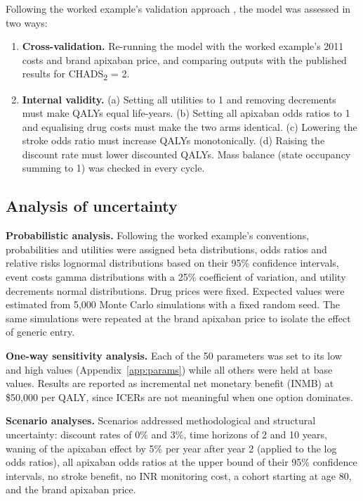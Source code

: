 \documentclass[11pt,letterpaper]{article}
\begin{document}
Following the worked example's validation approach \cite{cadthwe}, the model was assessed in two
ways:
\begin{enumerate}
  \item \textbf{Cross-validation.} Re-running the model with the worked example's 2011 costs and
        brand apixaban price, and comparing outputs with the published results for
        CHADS\textsubscript{2} = 2.
  \item \textbf{Internal validity.} (a) Setting all utilities to 1 and removing decrements must
        make QALYs equal life-years. (b) Setting all apixaban odds ratios to 1 and equalising drug
        costs must make the two arms identical. (c) Lowering the stroke odds ratio must increase
        QALYs monotonically. (d) Raising the discount rate must lower discounted QALYs. Mass balance
        (state occupancy summing to 1) was checked in every cycle.
\end{enumerate}

\subsection{Analysis of uncertainty}

\textbf{Probabilistic analysis.} Following the worked example's conventions, probabilities and
utilities were assigned beta distributions, odds ratios and relative risks lognormal distributions
based on their 95\% confidence intervals, event costs gamma distributions with a 25\% coefficient
of variation, and utility decrements normal distributions. Drug prices were fixed. Expected values
were estimated from 5,000 Monte Carlo simulations with a fixed random seed. The same simulations
were repeated at the brand apixaban price to isolate the effect of generic entry.

\textbf{One-way sensitivity analysis.} Each of the 50 parameters was set to its low and high
values (Appendix~\ref{app:params}) while all others were held at base values. Results are reported
as incremental net monetary benefit (INMB) at \$50,000 per QALY, since ICERs are not meaningful
when one option dominates.

\textbf{Scenario analyses.} Scenarios addressed methodological and structural uncertainty:
discount rates of 0\% and 3\%, time horizons of 2 and 10 years, waning of the apixaban effect by
5\% per year after year 2 (applied to the log odds ratios), all apixaban odds ratios at the upper
bound of their 95\% confidence intervals, no stroke benefit, no INR monitoring cost, a cohort
starting at age 80, and the brand apixaban price.
\end{document}
